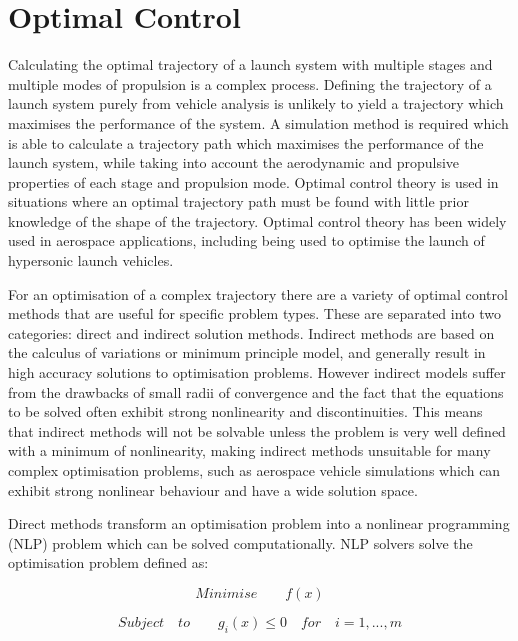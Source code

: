 \section{Optimal Control}\label{sec:Optimisation}


 Calculating the optimal trajectory of a launch system with multiple stages and multiple modes of propulsion is a complex process. 
 Defining the trajectory of a launch system purely from vehicle analysis is unlikely to yield a trajectory which maximises the performance of the system.
  A simulation method is required which is able to calculate a trajectory path which maximises the performance of the launch system, while taking into account the aerodynamic and propulsive properties of each stage and propulsion mode. 
  Optimal control theory is used in situations where an optimal trajectory path must be found with little prior knowledge of the shape of the trajectory. Optimal control theory has been widely used in aerospace applications, including being used to optimise the launch of hypersonic launch vehicles\cite{Powell1991,Lu1993,Trefny1999,Roche2000,Pescetelli2012,Young2006}.
  
For an optimisation of a complex trajectory there are a variety of optimal control methods that are useful for specific problem types. These are separated into two categories: direct and indirect solution methods. Indirect methods are based on the calculus of variations or minimum principle model, and generally result in high accuracy solutions to optimisation problems\cite{Bulirsch1993}. However indirect models suffer from the drawbacks of small radii of convergence and the fact that the equations to be solved often exhibit strong nonlinearity and discontinuities. This means that indirect methods will not be solvable unless the problem is very well defined with a minimum of nonlinearity, making indirect methods unsuitable for many complex optimisation problems, such as aerospace vehicle simulations which can exhibit strong nonlinear behaviour and have a wide solution space. 

Direct methods transform an optimisation problem into a nonlinear programming (NLP) problem which can be solved computationally\cite{Stryk1992}. NLP solvers solve the optimisation problem defined as\cite{Bazaraa2013}:

\begin{equation}
Minimise \qquad f(x)
\end{equation}

\begin{equation}
Subject \quad to \qquad g_i(x)\leq0 \quad for \quad i=1,...,m
\end{equation}

